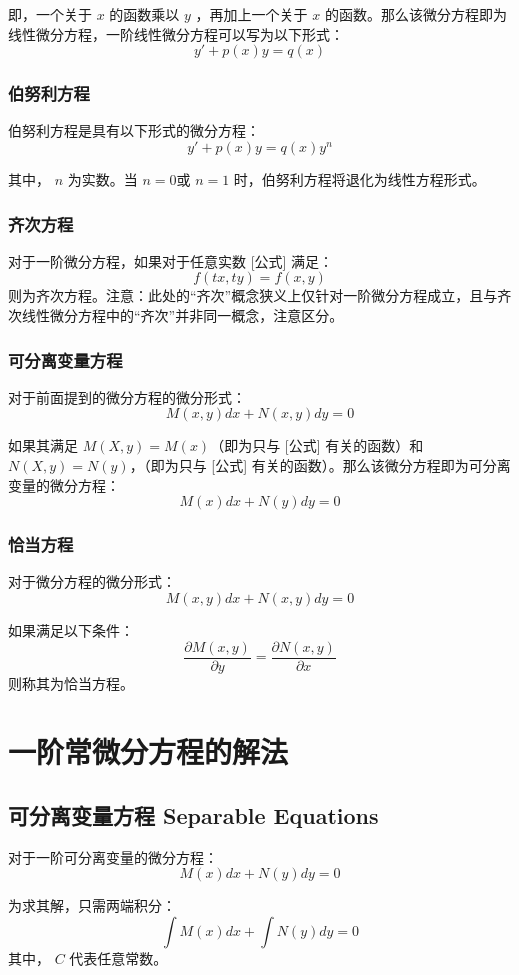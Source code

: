 \documentclass[12pt]{article}
\begin{document}
即，一个关于 $x$ 的函数乘以 $y$  ，再加上一个关于  $x$  的函数。那么该微分方程即为线性微分方程，一阶线性微分方程可以写为以下形式：
$$
y' + p(x)y = q(x)
$$

\subsubsection{伯努利方程}
伯努利方程是具有以下形式的微分方程：
$$
y' + p(x)y = q(x)y^n
$$

其中， $n$ 为实数。当 $n=0$或 $n=1$ 时，伯努利方程将退化为线性方程形式。

\subsubsection{齐次方程}
对于一阶微分方程，如果对于任意实数 [公式] 满足：
$$
f(tx,ty) = f(x,y)
$$
则为齐次方程。注意：此处的“齐次”概念狭义上仅针对一阶微分方程成立，且与齐次线性微分方程中的“齐次”并非同一概念，注意区分。

\subsubsection{可分离变量方程}
对于前面提到的微分方程的微分形式：
$$
M(x,y)dx + N(x,y)dy = 0
$$

如果其满足 $M(X,y)=M(x)$（即为只与 [公式] 有关的函数）和 $N(X,y)=N(y)$，（即为只与 [公式] 有关的函数）。那么该微分方程即为可分离变量的微分方程：
$$
M(x)dx + N(y)dy = 0
$$

\subsubsection{恰当方程}
对于微分方程的微分形式：
$$
M(x,y)dx + N(x,y)dy = 0
$$

如果满足以下条件：
$$
\frac{\partial M(x,y)}{\partial y} = \frac{\partial N(x,y)}{\partial x}
$$
则称其为恰当方程。

\section{一阶常微分方程的解法\cite{Differential_Equation_2_Solution}}
\subsection{可分离变量方程 Separable Equations}
对于一阶可分离变量的微分方程：
$$
M(x)dx + N(y)dy = 0
$$

为求其解，只需两端积分：
$$
\int M(x)dx + \int N(y)dy = 0
$$
其中， $C$ 代表任意常数。
\end{document}
